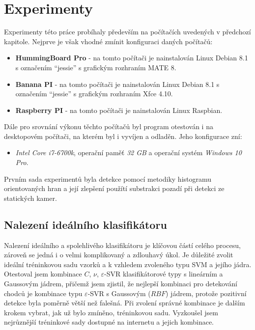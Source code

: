 \section{Experimenty}

Experimenty této práce probíhaly především na počítačích uvedených v předchozí kapitole. Nejprve je však vhodné zmínit konfiguraci daných počítačů:
\begin{itemize}
\item\textbf{HummingBoard Pro} - na tomto počítači je nainstalován Linux Debian 8.1 s označením ``jessie'' s grafickým rozhraním MATE 8.
\item\textbf{Banana PI} - na tomto počítači je nainstalován Linux Debian 8.1 s označením ``jessie'' s grafickým rozhraním Xfce 4.10. 
\item\textbf{Raspberry PI} - na tomto počítači je nainstalován Linux Raspbian. 
\end{itemize}

Dále pro srovnání výkonu těchto počítačů byl program otestován i na desktopovém počítači, na kterém byl i vyvíjen a odladěn. Jeho konfigurace zní: 
\begin{itemize}
\item\textit{Intel Core i7-6700k}, operační paměť  \textit{32 GB} a operační systém  \textit{Windows 10 Pro}.
\end{itemize}
Prvním sada experimentů byla detekce pomocí metodiky histogramu orientovaných hran a její zlepšení použítí substrakci pozadí při detekci ze statických kamer.

\subsection{Nalezení ideálního klasifikátoru}

Nalezení ideálního a spolehlivého klasifikátoru je klíčovou částí celého procesu, zároveň se jedná i o velmi komplikovaný a zdlouhavý úkol. Je důležité zvolit ideální tréninkovou sadu vzorků a k vzhledem zvoleného typu SVM a jejího jádra. Otestoval jsem kombinace $C$, $\nu$, $\varepsilon$-SVR klasifikátorové typy s lineárním a Gaussovým jádrem, přičemž jsem zjistil, že nejlepší kombinaci pro detekování chodců je kombinace typu $\varepsilon$-SVR s Gaussovým ($RBF$) jádrem, protože pozitivní detekce byla poměrně větší než falešná. Při zvolení správné kombinace je dalším krokem vybrat, jak už bylo zmíněno, tréninkovou sadu. Vyzkoušel jsem nejrůznější tréninkové sady dostupné na internetu a jejich kombinace.

